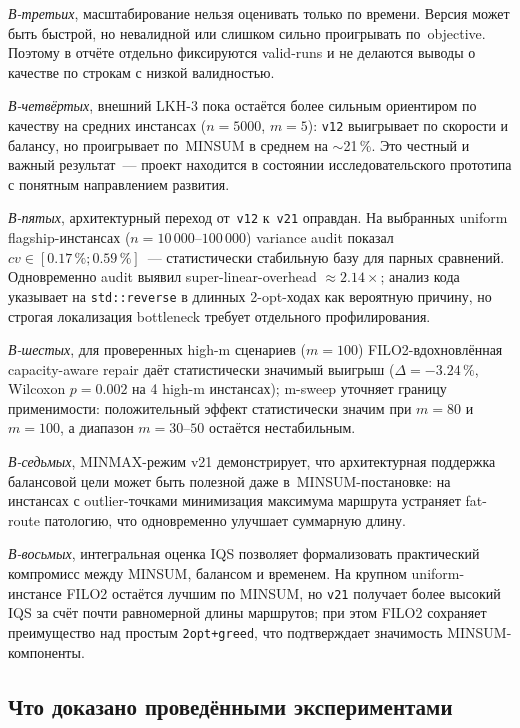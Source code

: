\documentclass[14pt,a4paper]{extarticle}
\begin{document}
\textit{В-третьих}, масштабирование нельзя оценивать только по времени. Версия может быть быстрой, но невалидной или слишком сильно проигрывать по~objective. Поэтому в отчёте отдельно фиксируются valid-runs и не делаются выводы о качестве по строкам с низкой валидностью.

\textit{В-четвёртых}, внешний LKH-3 пока остаётся более сильным ориентиром по качеству на средних инстансах ($n=5000$, $m=5$): \texttt{v12} выигрывает по скорости и балансу, но проигрывает по~MINSUM в среднем на $\sim$21\,\%. Это честный и важный результат~--- проект находится в состоянии исследовательского прототипа с понятным направлением развития.

\textit{В-пятых}, архитектурный переход от~\texttt{v12} к~\texttt{v21} оправдан. На выбранных uniform flagship-инстансах ($n=10\,000$--$100\,000$) variance audit показал $cv \in [0.17\,\%; 0.59\,\%]$~--- статистически стабильную базу для парных сравнений. Одновременно audit выявил super-linear-overhead $\approx 2.14\times$; анализ кода указывает на \texttt{std::reverse} в длинных 2-opt-ходах как вероятную причину, но строгая локализация bottleneck требует отдельного профилирования.

\textit{В-шестых}, для проверенных high-m сценариев ($m=100$) FILO2-вдохновлённая capacity-aware repair даёт статистически значимый выигрыш ($\Delta = -3.24\,\%$, Wilcoxon $p = 0.002$ на 4 high-m инстансах); m-sweep уточняет границу применимости: положительный эффект статистически значим при $m=80$ и $m=100$, а диапазон $m=30$--$50$ остаётся нестабильным.

\textit{В-седьмых}, MINMAX-режим v21 демонстрирует, что архитектурная поддержка балансовой цели может быть полезной даже в~MINSUM-постановке: на инстансах с outlier-точками минимизация максимума маршрута устраняет fat-route патологию, что одновременно улучшает суммарную длину.

\textit{В-восьмых}, интегральная оценка IQS позволяет формализовать практический компромисс между MINSUM, балансом и временем. На крупном uniform-инстансе FILO2 остаётся лучшим по MINSUM, но \texttt{v21} получает более высокий IQS за счёт почти равномерной длины маршрутов; при этом FILO2 сохраняет преимущество над простым \texttt{2opt+greed}, что подтверждает значимость MINSUM-компоненты.


\subsection{Что доказано проведёнными экспериментами}
\end{document}
